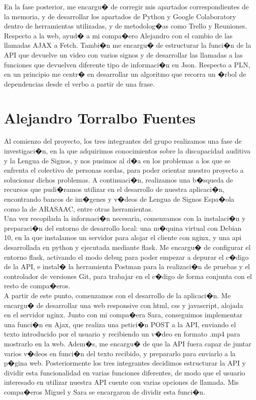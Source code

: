 En la fase posterior, me encargu� de corregir mis apartados correspondientes de la memoria, y de desarrollar los apartados de Python y Google Colaboratory dentro de herramientas utilizadas, y de metodolog�as como Trello y Reuniones. Respecto a la web, ayud� a mi compa�ero Alejandro con el cambio de las llamadas AJAX a Fetch. Tambi�n me encargu� de estructurar la funci�n de la API que devuelve un video con varios signos y de desarrollar las llamadas a las funciones que devuelven diferente tipo de informaci�n en Json. Respecto a PLN, en un principio me centr� en desarrollar un algoritmo que recorra un �rbol de dependencias desde el verbo a partir de una frase.\\


\section{Alejandro Torralbo Fuentes}


Al comienzo del proyecto, los tres integrantes del grupo realizamos una fase de investigaci�n, en la que adquirimos conocimientos sobre la discapacidad auditiva y la Lengua de Signos, y nos pusimos al d�a en los problemas a los que se enfrenta el colectivo de personas sordas, para poder orientar nuestro proyecto a solucionar dichos problemas. A continuaci�n, realizamos una b�squeda de recursos que pudi�ramos utilizar en el desarrollo de nuestra aplicaci�n, encontrando bancos de im�genes y v�deos de Lengua de Signos Espa�ola como la de ARASAAC, entre otras herramientas.\\

Una vez recopilada la informaci�n necesaria, comenzamos con la instalaci�n y preparaci�n del entorno de desarrollo local: una m�quina virtual con Debian 10, en la que instalamos un servidor para alojar el cliente con nginx, y una api desarrollada en python y ejecutada mediante flask. Me encargu� de configurar el entorno flask, activando el modo debug para poder empezar a depurar el c�digo de la API, e instal� la herramienta Postman para la realizaci�n de pruebas y el controlador de versiones Git, para trabajar en el c�digo de forma conjunta con el resto de compa�eros.\\

A partir de este punto, comenzamos con el desarrollo de la aplicaci�n. Me encargu� de desarrollar una web responsive con html, css y javascript, alojada en el servidor nginx. Junto con mi compa�era Sara, conseguimos implementar una funci�n en  Ajax, que realiza una petici�n POST a la API, enviando el texto introducido por el usuario y recibiendo un v�deo en formato .mp4 para mostrarlo en la web. Adem�s, me encargu� de que la API fuera capaz de juntar varios v�deos en funci�n del texto recibido, y prepararlo para enviarlo a la p�gina web. Posteriormente los tres integrantes decidimos estructurar la API y dividir esta funcionalidad en varias funciones diferentes, de modo que el usuario interesado en utilizar nuestra API cuente con varias opciones de llamada. Mis compa�eros Miguel y Sara se encargaron de dividir esta funci�n.\\

